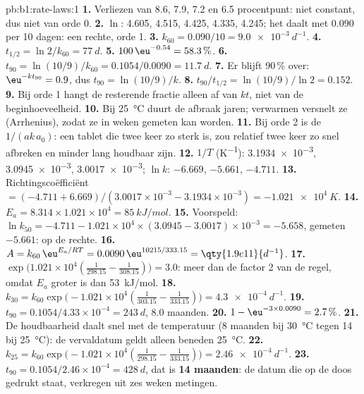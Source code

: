 \begin{solution}{pb:b1:rate-laws:1}
\textbf{1.} Verliezen van 8.6, 7.9, 7.2 en 6.5 procentpunt: niet
constant, dus niet van orde 0.
\textbf{2.} $\ln$: 4.605, 4.515, 4.425, 4.335, 4.245; het daalt met 0.090
per 10 dagen: een rechte, orde 1.
\textbf{3.} $k_{60} = 0.090/10 = \qty{9.0e-3}{d^{-1}}$.
\textbf{4.} $t_{1/2} = \ln2/k_{60} = \qty{77}{d}$.
\textbf{5.} $100\,\eu^{-0.54} = 58.3\,\%$.
\textbf{6.} $t_{90} = \ln(10/9)/k_{60} = 0.1054/0.0090 = \qty{11.7}{d}$.
\textbf{7.} Er blijft 90\,\% over: $\eu^{-kt_{90}} = 0.9$, dus
$t_{90} = \ln(10/9)/k$.
\textbf{8.} $t_{90}/t_{1/2} = \ln(10/9)/\ln2 = 0.152$.
\textbf{9.} Bij orde 1 hangt de resterende fractie alleen af van $kt$,
niet van de beginhoeveelheid.
\textbf{10.} Bij \qty{25}{\celsius} duurt de afbraak jaren; verwarmen
versnelt ze (Arrhenius), zodat ze in weken gemeten kan worden.
\textbf{11.} Bij orde 2 is de  $1/(ak\,a_0)$: een tablet
die twee keer zo sterk is, zou relatief twee keer zo snel afbreken en
minder lang houdbaar zijn.
\textbf{12.} $1/T$ (\unit{K^{-1}}): \num{3.1934e-3}, \num{3.0945e-3},
\num{3.0017e-3}; $\ln k$: $-6.669$, $-5.661$, $-4.711$.
\textbf{13.} Richtingscoëfficiënt $= (-4.711 + 6.669)/(3.0017 \times 10^{-3} - 3.1934 \times
10^{-3}) = \qty{-1.021e4}{K}$.
\textbf{14.} $E_a = 8.314 \times 1.021 \times 10^4 = \qty{85}{kJ/mol}$.
\textbf{15.} Voorspeld: $\ln k_{50} = -4.711 - 1.021 \times 10^4 \times (3.0945 -
3.0017) \times 10^{-3} = -5.658$, gemeten $-5.661$: op de rechte.
\textbf{16.} $A = k_{60}\,\eu^{E_a/RT} = 0.0090\,\eu^{10215/333.15} =
\qty{1.9e11}{d^{-1}}$.
\textbf{17.} $\exp\big(1.021 \times 10^4(\frac{1}{298.15} -
\frac{1}{308.15})\big) = 3.0$: meer dan de factor 2 van de regel, omdat
$E_a$ groter is dan \qty{53}{kJ/mol}.
\textbf{18.} $k_{30} = k_{60}\exp\big(-1.021 \times 10^4(\frac{1}{303.15} -
\frac{1}{333.15})\big) = \qty{4.3e-4}{d^{-1}}$.
\textbf{19.} $t_{90} = 0.1054/4.33 \times 10^{-4} = \qty{243}{d}$, 8.0
maanden.
\textbf{20.} $1 - \eu^{-3 \times 0.0090} = 2.7\,\%$.
\textbf{21.} De houdbaarheid daalt snel met de temperatuur (8 maanden bij
\qty{30}{\celsius} tegen 14 bij \qty{25}{\celsius}): de vervaldatum geldt
alleen beneden \qty{25}{\celsius}.
\textbf{22.} $k_{25} = k_{60}\exp\big(-1.021 \times 10^4(\frac{1}{298.15} -
\frac{1}{333.15})\big) = \qty{2.46e-4}{d^{-1}}$.
\textbf{23.} $t_{90} = 0.1054/2.46 \times 10^{-4} = \qty{428}{d}$, dat is
\textbf{14 maanden}: de datum die op de doos gedrukt staat, verkregen uit
zes weken metingen.
\end{solution}

